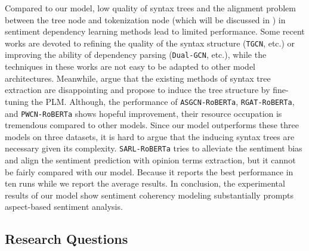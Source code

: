 Compared to our model, low quality of syntax trees and the alignment problem between the tree node and tokenization node (which will be discussed in ) in sentiment dependency learning methods lead to limited performance. Some recent works are devoted to refining the quality of the syntax structure (\texttt{TGCN}\cite{TianCS21}, etc.) or improving the ability of dependency parsing (\texttt{Dual-GCN}\cite{LiCFMWH20}, etc.), while the techniques in these works are not easy to be adapted to other model architectures. Meanwhile, \citet{DaiYSLQ21} argue that the existing methods of syntax tree extraction are disappointing and propose to induce the tree structure by fine-tuning the PLM. Although, the performance of \texttt{ASGCN-RoBERTa}, \texttt{RGAT-RoBERTa}, and \texttt{PWCN-RoBERTa} shows hopeful improvement, their resource occupation is tremendous compared to other models. Since our model outperforms these three models on three datasets, it is hard to argue that the inducing syntax trees are necessary given its complexity. \texttt{SARL-RoBERTa} tries to alleviate the sentiment bias and align the sentiment prediction with opinion terms extraction, but it cannot be fairly compared with our model. Because it reports the best performance in ten runs while we report the average results. In conclusion, the experimental results of our model show sentiment coherency modeling substantially prompts aspect-based sentiment analysis.

\subsection{Research Questions}
